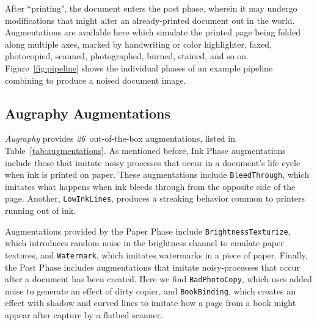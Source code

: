 \documentclass[runningheads]{llncs}
\newcommand{\numAugraphyAugmentations}{\emph{26}}
\begin{document}
After ``printing", the document enters the post phase, wherein it may undergo modifications that might alter an already-printed document out in the world.
Augmentations are available here which simulate the printed page being folded along multiple axes, marked by handwriting or color highlighter, faxed, photocopied, scanned, photographed, burned, stained, and so on.
Figure~\ref{fig:pipeline} shows the individual phases of an example pipeline combining to produce a noised document image.

\subsection{Augraphy Augmentations}

\emph{Augraphy} provides \numAugraphyAugmentations ~out-of-the-box augmentations, listed in Table~\ref{tab:augmentations}.
As mentioned before, Ink Phase augmentations include those that imitate noisy processes that occur in a document's life cycle when ink is printed on paper.
These augmentations include \texttt{BleedThrough}, which imitates what happens when ink bleeds through from the opposite side of the page.
Another, \texttt{LowInkLines}, produces a streaking behavior common to printers running out of ink.

Augmentations provided by the Paper Phase include \texttt{BrightnessTexturize}, which introduces random noise in the brightness channel to emulate paper textures, and \texttt{Watermark}, which imitates watermarks in a piece of paper.
Finally, the Post Phase includes augmentations that imitate noisy-processes that occur after a document has been created.
Here we find \texttt{BadPhotoCopy}, which uses added noise to generate an effect of dirty copier, and \texttt{BookBinding}, which creates an effect with shadow and curved lines to imitate how a page from a book might appear after capture by a flatbed scanner.
\end{document}
